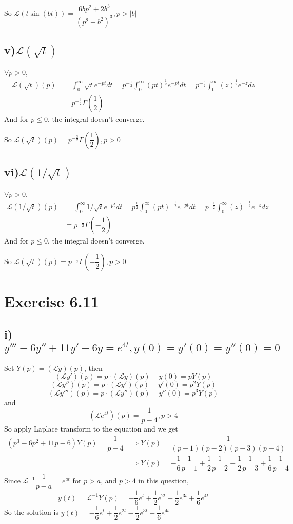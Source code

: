 \documentclass[a4paper,12pt,titlepage]{article}
\begin{document}
So $\mathcal{L}(t\sin(bt))=\dfrac{6bp^2+2b^3}{(p^2-b^2)^3}, p>|b|$

\subsection*{v)$\mathcal{L}(\sqrt{t})$}
$\forall p>0$,
\begin{align*}
\mathcal{L}(\sqrt{t})(p)&=\int_0^{\infty}\sqrt{t}e^{-pt}dt=p^{-\frac{1}{2}}\int_0^{\infty}(pt)^{\frac{1}{2}}e^{-pt}dt=p^{-\frac{3}{2}}\int_0^{\infty}(z)^{\frac{1}{2}}e^{-z}dz\\
&=p^{-\frac{3}{2}}\Gamma(\dfrac{1}{2})
\end{align*}
And for $ p\leqslant0$, the integral doesn't converge.

So $\mathcal{L}(\sqrt{t})(p)=p^{-\frac{3}{2}}\Gamma(\dfrac{1}{2}), p>0$

\subsection*{vi)$\mathcal{L}(1/\sqrt{t})$}
$\forall p>0$,
\begin{align*}
\mathcal{L}(1/\sqrt{t})(p)&=\int_0^{\infty}1/\sqrt{t}e^{-pt}dt=p^{\frac{1}{2}}\int_0^{\infty}(pt)^{-\frac{1}{2}}e^{-pt}dt=p^{-\frac{1}{2}}\int_0^{\infty}(z)^{-\frac{1}{2}}e^{-z}dz\\
&=p^{-\frac{1}{2}}\Gamma(-\dfrac{1}{2})
\end{align*}
And for $ p\leqslant0$, the integral doesn't converge.

So $\mathcal{L}(\sqrt{t})(p)=p^{-\frac{1}{2}}\Gamma(-\dfrac{1}{2}), p>0$
\section*{Exercise 6.11}
\subsection*{i)$y'''-6y''+11y'-6y=e^{4t},y(0)=y'(0)=y''(0)=0$}
Set $Y(p)=(\mathcal{L}y)(p)$, then
$$(\mathcal{L}y')(p)=p\cdot(\mathcal{L}y)(p)-y(0)=pY(p) $$
$$(\mathcal{L}y'')(p)=p\cdot(\mathcal{L}y')(p)-y'(0)=p^2Y(p) $$
$$(\mathcal{L}y''')(p)=p\cdot(\mathcal{L}y'')(p)-y''(0)=p^3Y(p) $$
and
$$(\mathcal{L}e^{4t})(p)=\dfrac{1}{p-4},p>4$$
So apply Laplace transform to the equation and we get
\begin{align*}
(p^3-6p^2+11p-6)Y(p)=\dfrac{1}{p-4}&\Rightarrow Y(p)=\dfrac{1}{(p-1)(p-2)(p-3)(p-4)}\\
&\Rightarrow Y(p)=-\dfrac{1}{6}\dfrac{1}{p-1}+\dfrac{1}{2}\dfrac{1}{p-2}-\dfrac{1}{2}\dfrac{1}{p-3}+\dfrac{1}{6}\dfrac{1}{p-4}
\end{align*}
Since $\mathcal{L}^{-1}\dfrac{1}{p-a}=e^{at}$ for $p>a$, and $p>4$ in this question, 
$$y(t)=\mathcal{L}^{-1}Y(p)=-\dfrac{1}{6}e^t+\dfrac{1}{2}e^{2t}-\dfrac{1}{2}e^{3t}+\dfrac{1}{6}e^{4t}$$
So the solution is $y(t)=-\dfrac{1}{6}e^t+\dfrac{1}{2}e^{2t}-\dfrac{1}{2}e^{3t}+\dfrac{1}{6}e^{4t}$
\end{document}
